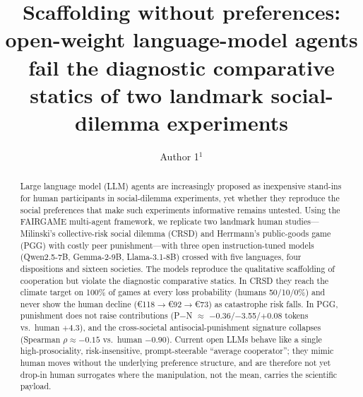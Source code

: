 \documentclass[openacc]{rsproca_new}%
\begin{document}
\title{Scaffolding without preferences: open-weight language-model agents fail the diagnostic comparative statics of two landmark social-dilemma experiments}

\author{%
Author 1$^{1}$}

\address{$^{1}$Affiliation, City, Country}

\subject{computational social science, artificial intelligence, behavioural science}



\begin{abstract}

Large language model (LLM) agents are increasingly proposed as inexpensive stand-ins for human participants in social-dilemma experiments, yet whether they reproduce the social preferences that make such experiments informative remains untested. Using the FAIRGAME multi-agent framework, we replicate two landmark human studies---Milinski's collective-risk social dilemma (CRSD) and Herrmann's public-goods game (PGG) with costly peer punishment---with three open instruction-tuned models (Qwen2.5-7B, Gemma-2-9B, Llama-3.1-8B) crossed with five languages, four dispositions and sixteen societies. The models reproduce the qualitative scaffolding of cooperation but violate the diagnostic comparative statics. In CRSD they reach the climate target on 100\% of games at every loss probability (humans 50/10/0\%) and never show the human decline (\euro118$\rightarrow$\euro92$\rightarrow$\euro73) as catastrophe risk falls. In PGG, punishment does not raise contributions (P$-$N $\approx$ $-$0.36/$-$3.55/$+$0.08 tokens vs.\ human $+$4.3), and the cross-societal antisocial-punishment signature collapses (Spearman $\rho \approx -0.15$ vs.\ human $-0.90$). Current open LLMs behave like a single high-prosociality, risk-insensitive, prompt-steerable ``average cooperator''; they mimic human moves without the underlying preference structure, and are therefore not yet drop-in human surrogates where the manipulation, not the mean, carries the scientific payload.

\end{abstract}
\end{document}
